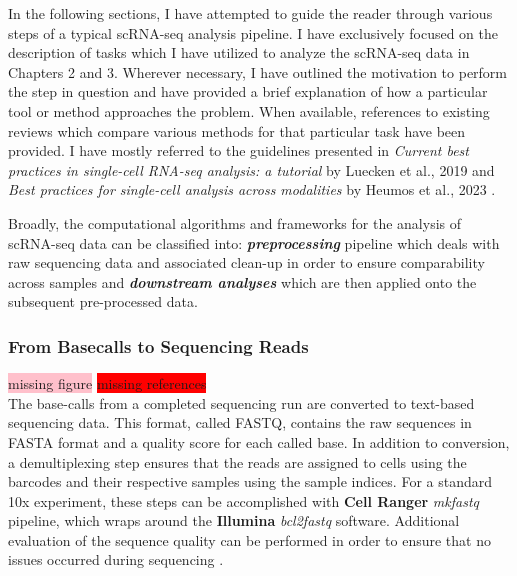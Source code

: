 \begin{Abstract}
\vspace{3mm}
In the following sections, I have attempted to guide the reader through various steps of a typical scRNA-seq analysis pipeline. I have exclusively focused on the description of tasks which I have utilized to analyze the scRNA-seq data in Chapters 2 and 3. Wherever necessary, I have outlined the motivation to perform the step in question and have provided a brief explanation of how a particular tool or method approaches the problem. When available, references to existing reviews which compare various methods for that particular task have been provided. I have mostly referred to the guidelines presented in \textit{Current best practices in single-cell RNA-seq analysis: a tutorial} by Luecken et al., 2019 \textbf{\cite{lueckenmalte_d_current_2019}} and \textit{Best practices for single-cell analysis across modalities} by Heumos et al., 2023 \textbf{\cite{heumos_best_2023}}.
\vspace{3mm}
\end{Abstract}

\clearpage

Broadly, the computational algorithms and frameworks for the analysis of scRNA-seq data can be classified into: \textit{\textbf{preprocessing}} pipeline which deals with raw sequencing data and associated clean-up in order to ensure comparability across samples and \textbf{\textit{downstream analyses}} which are then applied onto the subsequent pre-processed data.

\subsubsection{From Basecalls to Sequencing Reads}
\colorbox{pink}{missing figure} \colorbox{red}{missing references}\\
The base-calls from a completed sequencing run are converted to text-based sequencing data. This format, called FASTQ, contains the raw sequences in FASTA format and a quality score for each called base. In addition to conversion, a demultiplexing step ensures that the reads are assigned to cells using the barcodes and their respective samples using the sample indices. For a standard 10x experiment, these steps can be accomplished with \textbf{Cell Ranger} \textit{mkfastq} pipeline, which wraps around the \textbf{Illumina} \textit{bcl2fastq} software. Additional evaluation of the sequence quality can be performed in order to ensure that no issues occurred during sequencing \textbf{\cite{andrews_fastqc_2012}}.

